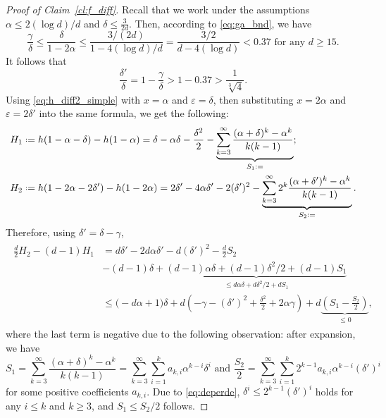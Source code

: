 \documentclass[12pt]{amsart}
\theoremstyle{definition}
\newcommand\al{\alpha}
\newcommand\ga{\gamma}
\newcommand\de{\delta}
\newcommand\eps{\varepsilon}
\newcommand{\defeq}{\mathrel{\vcenter{\baselineskip0.5ex \lineskiplimit0pt
                     \hbox{\scriptsize.}\hbox{\scriptsize.}}}%
                     =}
\begin{document}
\begin{proof}[Proof of Claim~\ref{cl:f_diff}]
Recall that we work under the assumptions $\al\leq 2(\log d)/d$ and $\de \leq \frac{3}{2d}$. Then, according to \eqref{eq:ga_bnd}, we have 
%
\[ \frac{\ga}{\de} 
\leq \frac{\de}{1-2\al}
\leq \frac{3/(2d)}{1-4(\log d)/d} 
= \frac{3/2}{d-4(\log d)} < 0.37 
\text{ for any } d \geq 15. \]
%
It follows that 
\begin{equation} \label{eq:deperde}
\frac{\de'}{\de} = 1 - \frac{\ga}{\de} 
> 1- 0.37 
> \frac{1}{\sqrt[3]{4}} .
\end{equation}
%
Using \eqref{eq:h_diff2_simple} with $x=\al$ and $\eps=\de$, then substituting $x=2 \al$ and $\eps=2 \de'$ into the same formula, we get the following: 
%
\begin{align*} 
H_1 &\defeq h(1-\al-\de) - h(1-\al) 
= \de - \al\de - \frac{\de^2}{2}  
- \underbrace{\sum_{k=3}^\infty 
\frac{(\al+\de)^k-\al^k}{k(k-1)} }_{S_1 \defeq} ;\\
H_2 &\defeq h(1-2\al-2\de') - h(1-2\al) 
= 2 \de' - 4 \al \de' - 2 (\de')^2 
- \underbrace{\sum_{k=3}^\infty 
2^k \frac{(\al+\de')^k-\al^k}{k(k-1)}}_{S_2 \defeq} .
\end{align*}
%
Therefore, using $\de'=\de-\ga$, 
%
\begin{align} 
\begin{split}
\frac{d}{2} H_2 - (d-1)H_1
&= d\de'-2d\al\de' - d (\de')^2 - \frac{d}{2} S_2\\
&- (d-1) \de 
+ \underbrace{(d-1)\al \de + (d-1)\de^2/2 + (d-1) S_1}_
{\leq d\al \de + d\de^2/2 + d S_1} \\
&\leq \big( -d\al + 1 \big) \de + 
d\left( -\ga -(\de')^2 + \frac{\de^2}{2} + 2\al\ga \right) 
+ d\underbrace{ \left( S_1 - \frac{S_2}{2} \right)}_{\leq 0} ,
\label{eq:bnd3}
\end{split}
\end{align}
%
where the last term is negative due to the following observation: after expansion, we have 
%
\[ S_1 = \sum_{k=3}^\infty \frac{(\al+\de)^k-\al^k}{k(k-1)} 
= \sum_{k=3}^\infty \sum_{i=1}^k a_{k,i} \al^{k-i} \de^i 
\text{ and } 
\frac{S_2}{2} = \sum_{k=3}^\infty \sum_{i=1}^k 
2^{k-1} a_{k,i} \al^{k-i} (\de')^i
\]
%
for some positive coefficients $a_{k,i}$. Due to \eqref{eq:deperde}, $\de^i \leq 2^{k-1} (\de')^i$ holds for any $i \leq k$ and $k \geq 3$, and $S_1 \leq S_2/2$ follows.  


\end{proof}
\end{document}
